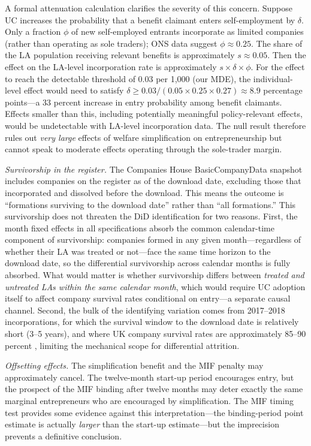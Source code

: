 \documentclass[12pt]{article}
\begin{document}
A formal attenuation calculation clarifies the severity of this concern. Suppose UC increases the probability that a benefit claimant enters self-employment by $\delta$. Only a fraction $\phi$ of new self-employed entrants incorporate as limited companies (rather than operating as sole traders); ONS data suggest $\phi \approx 0.25$. The share of the LA population receiving relevant benefits is approximately $s \approx 0.05$. Then the effect on the LA-level incorporation rate is approximately $s \times \delta \times \phi$. For the effect to reach the detectable threshold of 0.03 per 1,000 (our MDE), the individual-level effect would need to satisfy $\delta \geq 0.03 / (0.05 \times 0.25 \times 0.27) \approx 8.9$ percentage points---a 33 percent increase in entry probability among benefit claimants. Effects smaller than this, including potentially meaningful policy-relevant effects, would be undetectable with LA-level incorporation data. The null result therefore rules out \textit{very large} effects of welfare simplification on entrepreneurship but cannot speak to moderate effects operating through the sole-trader margin.

\textit{Survivorship in the register.} The Companies House BasicCompanyData snapshot includes companies on the register as of the download date, excluding those that incorporated and dissolved before the download. This means the outcome is ``formations surviving to the download date'' rather than ``all formations.'' This survivorship does not threaten the DiD identification for two reasons. First, the month fixed effects in all specifications absorb the common calendar-time component of survivorship: companies formed in any given month---regardless of whether their LA was treated or not---face the same time horizon to the download date, so the differential survivorship across calendar months is fully absorbed. What would matter is whether survivorship differs between \textit{treated and untreated LAs within the same calendar month}, which would require UC adoption itself to affect company survival rates conditional on entry---a separate causal channel. Second, the bulk of the identifying variation comes from 2017--2018 incorporations, for which the survival window to the download date is relatively short (3--5 years), and where UK company survival rates are approximately 85--90 percent \citep{ons2022business}, limiting the mechanical scope for differential attrition.

\textit{Offsetting effects.} The simplification benefit and the MIF penalty may approximately cancel. The twelve-month start-up period encourages entry, but the prospect of the MIF binding after twelve months may deter exactly the same marginal entrepreneurs who are encouraged by simplification. The MIF timing test provides some evidence against this interpretation---the binding-period point estimate is actually \textit{larger} than the start-up estimate---but the imprecision prevents a definitive conclusion.
\end{document}
